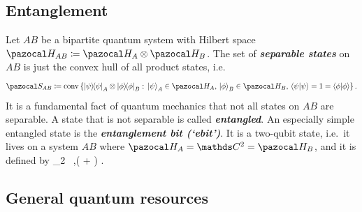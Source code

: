\documentclass[11pt,notitlepage,tightenlines,nofootinbib,superscriptaddress]{revtex4-1}
\newcommand{\deff}[1]{\textbf{\emph{#1}}}
\begin{document}

\subsection{Entanglement}

Let $AB$ be a bipartite quantum system with Hilbert space $\HH_{AB}\coloneqq \HH_A\otimes \HH_B$.  The set of \deff{separable states} on $AB$ is just the convex hull of all product states, i.e.~\cite{Werner}
\begin{equation}
    \SEP_{AB} \coloneqq \mathrm{conv}\left\{ \ketbra{\psi}_A \otimes \ketbra{\phi}_B:\, \ket{\psi}_A\in \HH_A,\, \ket{\phi}_B\in \HH_B,\, \braket{\psi|\psi}=1=\braket{\phi|\phi} \right\} .
    \label{SEP}
\end{equation}
It is a fundamental fact of quantum mechanics that not all states on $AB$ are separable. A state that is not separable is called \deff{entangled}. An especially simple entangled state is the \deff{entanglement bit (`ebit')}. It is a two-qubit state, i.e.\ it lives on a system $AB$ where $\HH_A = \C^2 = \HH_B$, and it is defined by
\bb
\Phi_2 \coloneqq {}\, ,\qquad {}\coloneqq {}\left(  +  \right) .
\ee


\subsection{General quantum resources} \label{general_resources_sec}
\end{document}
